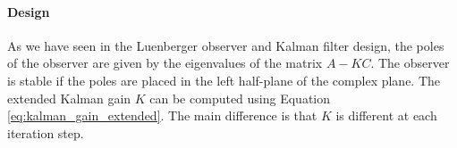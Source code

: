 \paragraph{Design}
As we have seen in the Luenberger observer and Kalman filter design, the poles of the observer are given by the eigenvalues of the matrix $A - KC$. The observer is stable if the poles are placed in the left half-plane of the complex plane.
The extended Kalman gain $K$ can be computed using Equation \ref{eq:kalman_gain_extended}. The main difference is that $K$ is different at each iteration step.

